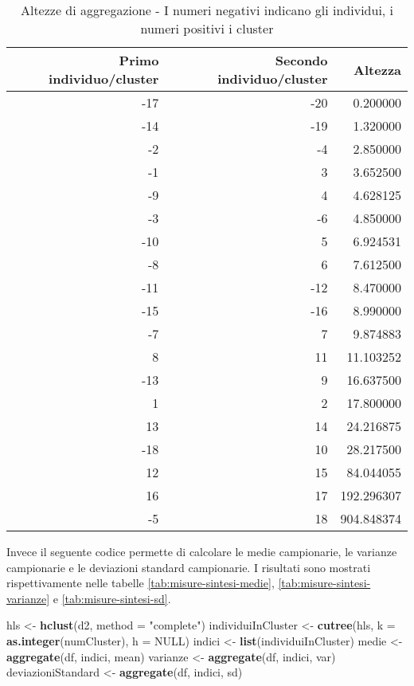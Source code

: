 \documentclass[]{book}
\newenvironment{Shaded}{\begin{snugshade}}{\end{snugshade}}
\newcommand{\KeywordTok}[1]{\textcolor[rgb]{0.13,0.29,0.53}{\textbf{#1}}}
\newcommand{\DataTypeTok}[1]{\textcolor[rgb]{0.13,0.29,0.53}{#1}}
\newcommand{\StringTok}[1]{\textcolor[rgb]{0.31,0.60,0.02}{#1}}
\newcommand{\OtherTok}[1]{\textcolor[rgb]{0.56,0.35,0.01}{#1}}
\newcommand{\NormalTok}[1]{#1}
\begin{document}
\begin{table}

\caption{\label{tab:altezze}Altezze di aggregazione - I numeri negativi indicano gli individui, i numeri positivi i cluster}
\centering
\begin{tabular}[t]{r|r|r}
\hline
Primo individuo/cluster & Secondo individuo/cluster & Altezza\\
\hline
-17 & -20 & 0.200000\\
\hline
-14 & -19 & 1.320000\\
\hline
-2 & -4 & 2.850000\\
\hline
-1 & 3 & 3.652500\\
\hline
-9 & 4 & 4.628125\\
\hline
-3 & -6 & 4.850000\\
\hline
-10 & 5 & 6.924531\\
\hline
-8 & 6 & 7.612500\\
\hline
-11 & -12 & 8.470000\\
\hline
-15 & -16 & 8.990000\\
\hline
-7 & 7 & 9.874883\\
\hline
8 & 11 & 11.103252\\
\hline
-13 & 9 & 16.637500\\
\hline
1 & 2 & 17.800000\\
\hline
13 & 14 & 24.216875\\
\hline
-18 & 10 & 28.217500\\
\hline
12 & 15 & 84.044055\\
\hline
16 & 17 & 192.296307\\
\hline
-5 & 18 & 904.848374\\
\hline
\end{tabular}
\end{table}

Invece il seguente codice permette di calcolare le medie campionarie, le
varianze campionarie e le deviazioni standard campionarie. I risultati
sono mostrati rispettivamente nelle tabelle
\ref{tab:misure-sintesi-medie}, \ref{tab:misure-sintesi-varianze} e
\ref{tab:misure-sintesi-sd}.

\begin{Shaded}
\begin{Highlighting}[]
\NormalTok{hls <-}\StringTok{ }\KeywordTok{hclust}\NormalTok{(d2, }\DataTypeTok{method =} \StringTok{"complete"}\NormalTok{)}
\NormalTok{individuiInCluster <-}\StringTok{ }\KeywordTok{cutree}\NormalTok{(hls, }\DataTypeTok{k =} \KeywordTok{as.integer}\NormalTok{(numCluster), }\DataTypeTok{h =} \OtherTok{NULL}\NormalTok{)}
\NormalTok{indici <-}\StringTok{ }\KeywordTok{list}\NormalTok{(individuiInCluster)}
\NormalTok{medie <-}\StringTok{ }\KeywordTok{aggregate}\NormalTok{(df, indici, mean)}
\NormalTok{varianze <-}\StringTok{ }\KeywordTok{aggregate}\NormalTok{(df, indici, var)}
\NormalTok{deviazioniStandard <-}\StringTok{ }\KeywordTok{aggregate}\NormalTok{(df, indici, sd)}
\end{Highlighting}
\end{Shaded}
\end{document}
